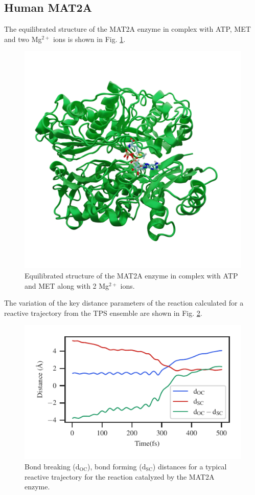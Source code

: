 \documentclass[journal=jpcbfk,manuscript=article,layout=traditional]{achemso}
\begin{document}
\subsection{Human MAT2A}
The equilibrated structure of the MAT2A enzyme in complex with 
ATP, MET and two Mg$^{2+}$ ions is shown in Fig. \ref{fig:mat2a-equil}.
\begin{figure}[ht!]
\centering
\includegraphics[scale=0.2]{figures/mat2a-equil.png}
\caption{Equilibrated structure of the MAT2A enzyme in complex with ATP and 
MET along with 2 Mg$^{2+}$ ions.}
\label{fig:mat2a-equil}
\end{figure}
The variation of the key distance parameters of the reaction calculated for 
a reactive trajectory from the TPS ensemble are shown in Fig. \ref{fig:mat2a-reactive-traj}.
\begin{figure}
\includegraphics[scale=1.0]{figures/mat2a-diff167.pdf}
\caption{Bond breaking ($\mathrm{d}_{\mathrm{OC}}$), bond forming 
($\mathrm{d}_{\mathrm{SC}}$) distances for a typical 
reactive trajectory for the reaction catalyzed by the MAT2A enzyme.}
\label{fig:mat2a-reactive-traj}
\end{figure}
\end{document}
